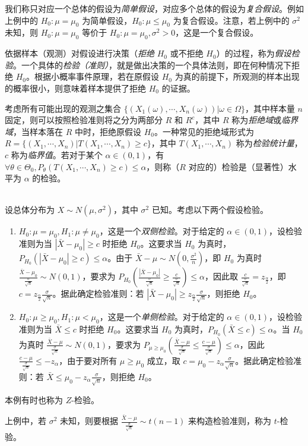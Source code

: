 \documentclass[../main.tex]{subfiles}
\begin{document}
我们称只对应一个总体的假设为\emph{简单假设}，对应多个总体的假设为\emph{复合假设}。例如上例中的 $H_0:\mu=\mu_0$ 为简单假设，$H_0:\mu\leq\mu_0$ 为复合假设。注意，若上例中的 $\sigma^2$ 未知，则 $H_0:\mu=\mu_0$ 等价于 $H_0:\mu=\mu_0,\sigma^2>0$，这是一个复合假设。

依据样本（观测）对假设进行决策（\emph{拒绝} $H_0$ 或不拒绝 $H_0$）的过程，称为\emph{假设检验}。一个具体的\emph{检验（准则）}，就是做出决策的一个具体法则，即在何种情况下拒绝 $H_0$。根据小概率事件原理，若在原假设 $H_0$ 为真的前提下，所观测的样本出现的概率很小，则意味着样本提供了拒绝 $H_0$ 的证据。

考虑所有可能出现的观测之集合 $\{(X_1(\omega),\cdots,X_n(\omega))|\omega\in\Omega\}$，其中样本量 $n$ 固定，则可以按照检验准则将之分为两部分 $R$ 和 $R^c$，其中 $R$ 称为\emph{拒绝域}或\emph{临界域}，当样本落在 $R$ 中时，拒绝原假设 $H_0$。一种常见的拒绝域形式为 $R=\{(X_1,\cdots,X_n)|T(X_1,\cdots,X_n)\geq c\}$，其中 $T(X_1,\cdots,X_n)$ 称为\emph{检验统计量}，$c$ 称为\emph{临界值}。若对于某个 $\alpha\in(0,1)$，有 $\forall\theta\in\Theta_0,P_\theta(T(X_1,\cdots,X_n)\geq c)\leq\alpha$，则称（$R$ 对应的）检验是（显著性）水平为 $\alpha$ 的检验。

\begin{example}
    \mbox{}\\
    设总体分布为 $X\sim N(\mu,\sigma^2)$，其中 $\sigma^2$ 已知。考虑以下两个假设检验。
    \begin{enumerate}
        \item $H_0:\mu=\mu_0,H_1:\mu\neq\mu_0$，这是一个\emph{双侧检验}。对于给定的 $\alpha\in(0,1)$，设检验准则为当 $|\bar X-\mu_0|\geq c$ 时拒绝 $H_0$。这要求当 $H_0$ 为真时，$P_{H_0}(|\bar X-\mu_0|\geq c)\leq\alpha$。由于 $\bar X-\mu\sim N(0,\frac{\sigma^2}n)$，即 $H_0$ 为真时 $\frac{\bar X-\mu_0}{\frac\sigma{\sqrt n}}\sim N(0,1)$，要求为 $P_{H_0}(\frac{|\bar X-\mu_0|}{\frac\sigma{\sqrt n}}\geq\frac c{\frac\sigma{\sqrt n}})\leq\alpha$，因此取 $\frac c{\frac{\sigma}{\sqrt n}}=z_{\frac\alpha 2}$，即 $c=z_{\frac\alpha 2}\frac\sigma{\sqrt n}$。据此确定检验准则：若 $|\bar X-\mu_0|\geq z_{\frac\alpha 2}\frac\sigma{\sqrt n}$，则拒绝 $H_0$。
        \item $H_0:\mu\geq\mu_0,H_1:\mu<\mu_0$，这是一个\emph{单侧检验}。对于给定的 $\alpha\in(0,1)$，设检验准则为当 $\bar X\leq c$ 时拒绝 $H_0$。这要求当 $H_0$ 为真时，$P_{H_0}(\bar X\leq c)\leq\alpha$。当 $H_0$ 为真时 $\frac{\bar X-\mu}{\frac\sigma{\sqrt n}}\sim N(0,1)$，要求为 $P_{\mu\geq\mu_0}(\frac{\bar X-\mu}{\frac\sigma{\sqrt n}}\leq\frac{c-\mu}{\frac\sigma{\sqrt n}})\leq\alpha$，因此 $\frac{c-\mu}{\frac{\sigma}{\sqrt n}}\leq-z_\alpha$，由于要对所有 $\mu\geq\mu_0$ 成立，取 $c=\mu_0-z_\alpha\frac\sigma{\sqrt n}$。据此确定检验准则：若 $\bar X\leq\mu_0-z_\alpha\frac\sigma{\sqrt n}$，则拒绝 $H_0$。
    \end{enumerate}
    本例有时也称为 $Z$-检验。
\end{example}

上例中，若 $\sigma^2$ 未知，则要根据 $\frac{\bar X-\mu}{\frac\sigma{\sqrt n}}\sim t(n-1)$ 来构造检验准则，称为 $t$-检验。
\end{document}
